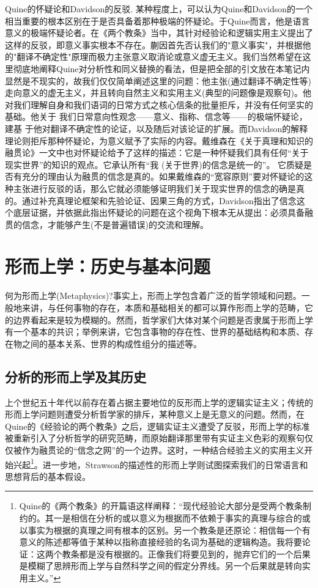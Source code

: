 \documentclass{article}
\begin{document}
{{\heiti Quine的怀疑论和Davidson的反驳.}
某种程度上，可以认为Quine和Davidson的一个相当重要的根本区别在于是否具备着那种极端的怀疑论。于Quine而言，他是语言意义的极端怀疑论者。在《两个教条》当中，其针对经验论和逻辑实用主义提出了这样的反驳，即意义事实根本不存在。蒯因首先否认我们的"意义事实"，并根据他的"翻译不确定性"原理而极力主张意义取消论或意义虚无主义。我们当然希望在这里彻底地阐释Quine对分析性和同义替换的看法，但是把全部的引文放在本笔记内显然是不现实的，故我们仅仅简单阐述这里的问题：他主张(通过翻译不确定性等)走向意义的虚无主义，并且转向自然主义和实用主义(典型的问题像是观察句)。他对我们理解自身和我们语词的日常方式之核心信条的批量拒斥，并没有任何坚实的基础。他关于 我们日常意向性观念——意义、指称、信念等——的极端怀疑论，建基 于他对翻译不确定性的论证，以及随后对该论证的扩展。而Davidson的解释理论则拒斥那种怀疑论，为意义赋予了实际的内容。戴维森在《关于真理和知识的融贯论》一文中也对怀疑论给予了这样的描述：它是一种怀疑我们具有任何“关于现实世界”的知识的观点。它承认所有“我 (关于世界)的信念是统一的”。 它质疑是否有充分的理由认为融贯的信念是真的。如果戴维森的“宽容原则”要对怀疑论的这种主张进行反驳的话，那么它就必须能够证明我们关于现实世界的信念的确是真的。通过补充真理论框架和先验论证、因果三角的方式，Davidson指出了信念这个底层证据，并依据此指出怀疑论的问题在这个视角下根本无从提出：必须具备融贯的信念，才能够产生(不是普遍错误)的交流和理解。
}
\section{形而上学：历史与基本问题}
何为形而上学(Metaphysics)?事实上，形而上学包含着广泛的哲学领域和问题。一般地来讲，与任何事物的存在，本质和基础相关的都可以算作形而上学的范畴，它的边界看起来是较为模糊的。然而，哲学家们大体对某个问题是否隶属于形而上学有一个基本的共识；举例来讲，它包含事物的存在性、世界的基础结构和本质、存在物之间的基本关系、世界的构成性组分的描述等。

\subsection{分析的形而上学及其历史}
上个世纪五十年代以前存在着占据主要地位的反形而上学的逻辑实证主义；传统的形而上学问题则遭受分析哲学家的排斥，某种意义上是无意义的问题。然而，在Quine的《经验论的两个教条》之后，逻辑实证主义遭受了反驳，形而上学的标准被重新引入了分析哲学的研究范畴，而原始翻译那里带有实证主义色彩的观察句仅仅被作为融贯论的“信念之网”的一个边界。这时，一种结合经验主义的实用主义开始兴起\footnote{Quine的《两个教条》的开篇语这样阐释：“现代经验论大部分是受两个教条制约的。其一是相信在分析的或以意义为根据而不依赖于事实的真理与综合的或以事实为根据的真理之间有根本的区别。另一个教条是还原论：相信每一个有意义的陈述都等值于某种以指称直接经验的名词为基础的逻辑构造。我将要论证：这两个教条都是没有根据的。正像我们将要见到的，抛弃它们的一个后果是模糊了思辨形而上学与自然科学之间的假定分界线。另一个后果就是转向实用主义。”}。进一步地，Strawson的描述性的形而上学则试图探索我们的日常语言和思想背后的基本假设。
\end{document}
